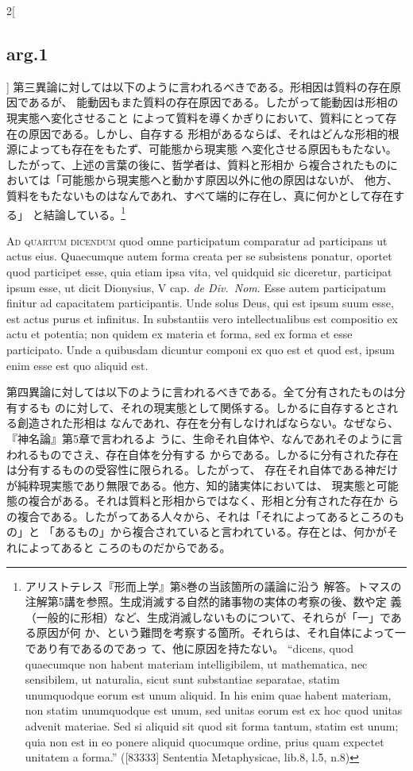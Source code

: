 \documentclass[paper=a4paper,fontsize=10pt,jafontsize=9pt,titlepage]{jlreq}
\begin{document}
\begin{paracol}{2}[\subsection{arg.1}]
第三異論に対しては以下のように言われるべきである。形相因は質料の存在原因であるが、
能動因もまた質料の存在原因である。したがって能動因は形相の現実態へ変化させること
によって質料を導くかぎりにおいて、質料にとって存在の原因である。しかし、自存する
形相があるならば、それはどんな形相的根源によっても存在をもたず、可能態から現実態
へ変化させる原因ももたない。したがって、上述の言葉の後に、哲学者は、質料と形相か
ら複合されたものにおいては「可能態から現実態へと動かす原因以外に他の原因はないが、
他方、質料をもたないものはなんであれ、すべて端的に存在し、真に何かとして存在する」
と結論している。\footnote{アリストテレス『形而上学』第8巻の当該箇所の議論に沿う
解答。トマスの注解第5講を参照。生成消滅する自然的諸事物の実体の考察の後、数や定
義（一般的に形相）など、生成消滅しないものについて、それらが「一」である原因が何
か、という難問を考察する箇所。それらは、それ自体によって一であり有であるのであっ
て、他に原因を持たない。 ``dicens, quod quaecumque non habent materiam
intelligibilem, ut mathematica, nec sensibilem, ut naturalia, sicut sunt
substantiae separatae, statim unumquodque eorum est unum aliquid. In his enim
quae habent materiam, non statim unumquodque est unum, sed unitas eorum est ex
hoc quod unitas advenit materiae. Sed si aliquid sit quod sit forma tantum,
statim est unum; quia non est in eo ponere aliquid quocumque ordine, prius quam
expectet unitatem a forma.'' ([83333] Sententia Metaphysicae, lib.8, l.5, n.8)}

\switchcolumn*[\subsection{ad 4}]

{\scshape Ad quartum dicendum} quod omne participatum comparatur ad participans
ut actus eius. Quaecumque autem forma creata per se subsistens ponatur, oportet
quod participet esse, quia etiam ipsa vita, vel quidquid sic diceretur,
participat ipsum esse, ut dicit Dionysius, V cap. {\itshape de Div.~Nom}. Esse
autem participatum finitur ad capacitatem participantis. Unde solus Deus, qui
est ipsum suum esse, est actus purus et infinitus. In substantiis vero
intellectualibus est compositio ex actu et potentia; non quidem ex materia et
forma, sed ex forma et esse participato. Unde a quibusdam dicuntur componi ex
quo est et quod est, ipsum enim esse est quo aliquid est.


\switchcolumn

第四異論に対しては以下のように言われるべきである。全て分有されたものは分有するも
のに対して、それの現実態として関係する。しかるに自存するとされる創造された形相は
なんであれ、存在を分有しなければならない。なぜなら、『神名論』第5章で言われるよ
うに、生命それ自体や、なんであれそのように言われるものでさえ、存在自体を分有する
からである。しかるに分有された存在は分有するものの受容性に限られる。したがって、
存在それ自体である神だけが純粋現実態であり無限である。他方、知的諸実体においては、
現実態と可能態の複合がある。それは質料と形相からではなく、形相と分有された存在か
らの複合である。したがってある人々から、それは「それによってあるところのもの」と
「あるもの」から複合されていると言われている。存在とは、何かがそれによってあると
ころのものだからである。

\end{paracol}
\end{document}
